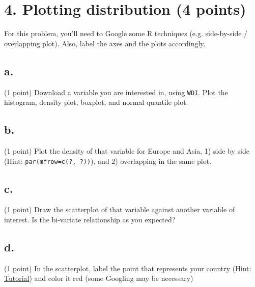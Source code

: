 \documentclass{article}\usepackage[]{graphicx}\usepackage[]{color}
\begin{document}
\section*{4. Plotting distribution (4 points)}

For this problem, you'll need to Google some R techniques (e.g. side-by-side / overlapping plot). Also, label the axes and the plots accordingly.

\subsection*{a.} (1 point) Download a variable you are interested in, using \verb`WDI`. Plot the histogram, density plot, boxplot, and normal quantile plot.

\subsection*{b.} (1 point) Plot the density of that variable for Europe and Asia, 1) side by side (Hint: \verb`par(mfrow=c(?, ?))`), and 2) overlapping in the same plot.

\subsection*{c.} (1 point) Draw the scatterplot of that variable against another variable of interest. Is the bi-variate relationship as you expected?

\subsection*{d.} (1 point) In the scatterplot, label the point that represents your country (Hint: \href{https://chemicalstatistician.wordpress.com/2013/03/02/adding-labels-to-points-in-a-scatter-plot-in-r/}{Tutorial}) and color it red (some Googling may be necessary)
\end{document}
